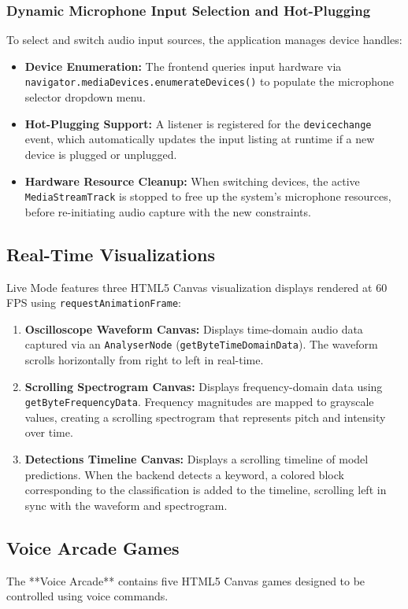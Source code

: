 \subsubsection{Dynamic Microphone Input Selection and Hot-Plugging}
To select and switch audio input sources, the application manages device handles:
\begin{itemize}
    \item \textbf{Device Enumeration:} The frontend queries input hardware via \texttt{navigator.mediaDevices.enumerateDevices()} to populate the microphone selector dropdown menu.
    \item \textbf{Hot-Plugging Support:} A listener is registered for the \texttt{devicechange} event, which automatically updates the input listing at runtime if a new device is plugged or unplugged.
    \item \textbf{Hardware Resource Cleanup:} When switching devices, the active \texttt{MediaStreamTrack} is stopped to free up the system's microphone resources, before re-initiating audio capture with the new constraints.
\end{itemize}


\subsection{Real-Time Visualizations}
Live Mode features three HTML5 Canvas visualization displays rendered at 60 FPS using \texttt{requestAnimationFrame}:

\begin{enumerate}
    \item \textbf{Oscilloscope Waveform Canvas:}
    Displays time-domain audio data captured via an \texttt{AnalyserNode} (\texttt{getByteTimeDomainData}). The waveform scrolls horizontally from right to left in real-time.
    \item \textbf{Scrolling Spectrogram Canvas:}
    Displays frequency-domain data using \texttt{getByteFrequencyData}. Frequency magnitudes are mapped to grayscale values, creating a scrolling spectrogram that represents pitch and intensity over time.
    \item \textbf{Detections Timeline Canvas:}
    Displays a scrolling timeline of model predictions. When the backend detects a keyword, a colored block corresponding to the classification is added to the timeline, scrolling left in sync with the waveform and spectrogram.
\end{enumerate}

\subsection{Voice Arcade Games}
The **Voice Arcade** contains five HTML5 Canvas games designed to be controlled using voice commands.

